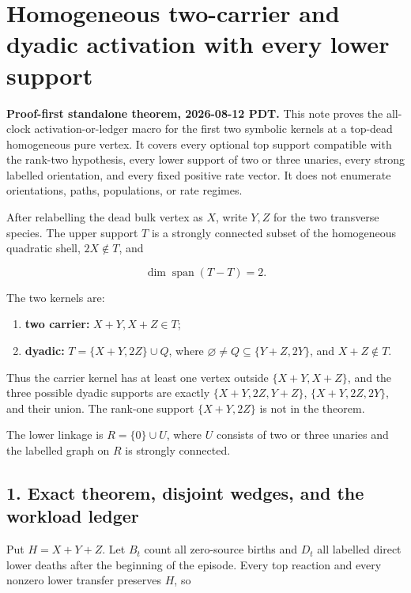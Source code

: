 \section{Homogeneous two-carrier and dyadic activation with every lower
support}

\textbf{Proof-first standalone theorem, 2026-08-12 PDT.} This note
proves the all-clock activation-or-ledger macro for the first two
symbolic kernels at a top-dead homogeneous pure vertex. It covers every
optional top support compatible with the rank-two hypothesis, every
lower support of two or three unaries, every strong labelled
orientation, and every fixed positive rate vector. It does not enumerate
orientations, paths, populations, or rate regimes.

After relabelling the dead bulk vertex as \(X\), write \(Y,Z\) for the
two transverse species. The upper support \(T\) is a strongly connected
subset of the homogeneous quadratic shell, \(2X\notin T\), and

\[
                         \dim\operatorname{span}(T-T)=2.
                                                               \tag{0.1}
\]

The two kernels are:

\begin{enumerate}
\def\labelenumi{\arabic{enumi}.}
\tightlist
\item
  \textbf{two carrier:} \(X+Y,X+Z\in T\);
\item
  \textbf{dyadic:} \(T=\{X+Y,2Z\}\cup Q\), where
  \(\varnothing\ne Q\subseteq\{Y+Z,2Y\}\), and \(X+Z\notin T\).
\end{enumerate}

Thus the carrier kernel has at least one vertex outside \(\{X+Y,X+Z\}\),
and the three possible dyadic supports are exactly \(\{X+Y,2Z,Y+Z\}\),
\(\{X+Y,2Z,2Y\}\), and their union. The rank-one support \(\{X+Y,2Z\}\)
is not in the theorem.

The lower linkage is \(R=\{0\}\cup U\), where \(U\) consists of two or
three unaries and the labelled graph on \(R\) is strongly connected.

\subsection{1. Exact theorem, disjoint wedges, and the workload
ledger}

Put \(H=X+Y+Z\). Let \(B_t\) count all zero-source births and \(D_t\)
all labelled direct lower deaths after the beginning of the episode.
Every top reaction and every nonzero lower transfer preserves \(H\), so

